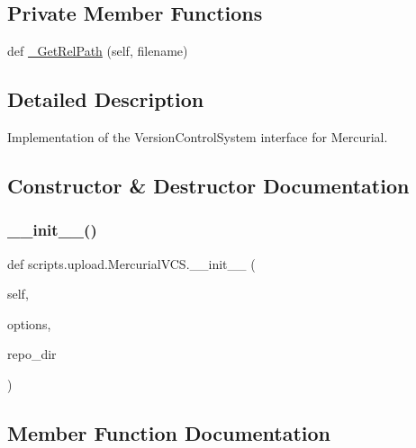 \subsection*{Private Member Functions}
\begin{DoxyCompactItemize}
\item 
def \mbox{\hyperlink{classscripts_1_1upload_1_1_mercurial_v_c_s_a4d2e824c407cf533872506c17f5002e5}{\+\_\+\+Get\+Rel\+Path}} (self, filename)
\end{DoxyCompactItemize}


\subsection{Detailed Description}
\begin{DoxyVerb}Implementation of the VersionControlSystem interface for Mercurial.\end{DoxyVerb}
 

\subsection{Constructor \& Destructor Documentation}
\mbox{\label{classscripts_1_1upload_1_1_mercurial_v_c_s_aee48a25ac8946b03569f178bfb9223ad}} 
\subsubsection{\texorpdfstring{\_\_init\_\_()}{\_\_init\_\_()}}
{\footnotesize\ttfamily def scripts.\+upload.\+Mercurial\+V\+C\+S.\+\_\+\+\_\+init\+\_\+\+\_\+ (\begin{DoxyParamCaption}\item[{}]{self,  }\item[{}]{options,  }\item[{}]{repo\+\_\+dir }\end{DoxyParamCaption})}



\subsection{Member Function Documentation}
\mbox{\label{classscripts_1_1upload_1_1_mercurial_v_c_s_a4d2e824c407cf533872506c17f5002e5}} 
